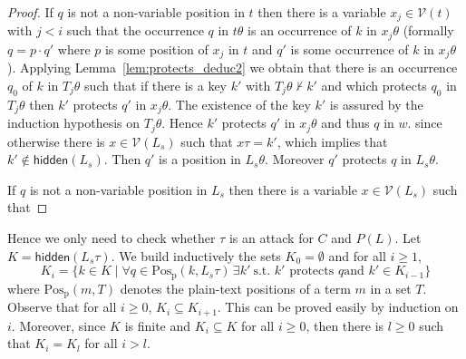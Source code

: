 \documentclass[acmtocl,acmnow]{acmtrans2m}
\newcommand{\var}{\mathcal{V}}
\newcommand{\set}[1]{\lbrace{#1}\rbrace}
\newcommand{\lset}[1]{#1_s}
\newcommand{\hidden}[1]{\mathsf{hidden}({#1})}
\newcommand{\posp}{\operatorname{Pos_p}} \newcommand{\sko}{\prec}
\begin{document}
\begin{proof}
If $q$ is not a non-variable position in $t$ then there is a variable $x_j\in\var(t)$ with $j<i$ such that
the occurrence $q$ in $t\theta$ is an occurrence of $k$ in $x_j\theta$
(formally $q=p\cdot q'$ where $p$ is some position of $x_j$ in $t$ and $q'$ is some occurrence of $k$ in $x_j\theta$).
Applying Lemma~\ref{lem:protects_deduc2} we obtain that there is an occurrence $q_0$ of $k$ in
$T_j\theta$ such that if there is a key $k'$ with $T_j\theta\not\vdash k'$ and
which protects $q_0$ in $T_j\theta$ then $k'$ protects $q'$ in $x_j\theta$. The existence of the
key $k'$ is assured by the induction hypothesis on $T_j\theta$. Hence $k'$ protects $q'$ in $x_j\theta$ 
and thus $q$ in $w$.
since otherwise there is $x\in\var(\lset{L})$ such that $x\tau=k'$, which implies that
$k'\notin\hidden{\lset{L}}$. Then $q'$ is a position in $\lset{L}\theta$. Moreover $q'$ protects $q$ in
$\lset{L}\theta$.

If $q$ is not a non-variable position in $\lset{L}$ then there is a variable $x\in\var(\lset{L})$ such that
\end{proof}





Hence we only need to check whether $\tau$ is an attack for $C$ and $P(L)$. Let 
$K=\hidden{\lset{L}\tau}$. We build inductively the sets $K_0=\emptyset$ and for all
$i\ge 1$,
$$K_{i}=\set{k\in K\mid \forall q\in\posp(k,\lset{L}\tau)\, \exists k'\ \mbox{s.t.~$k'$ protects $q$
and } k'\in K_{i-1}}$$
where $\posp(m,T)$ denotes the plain-text positions of a term $m$ in a set $T$.
Observe that for all $i\ge 0$, $K_i\subseteq K_{i+1}$. This can be proved easily by induction on $i$. Moreover, since $K$ is finite and $K_i\subseteq K$ for all $i\ge 0$,
then there is $l\ge 0$ such that $K_i=K_l$ for all $i> l$.
\end{document}
